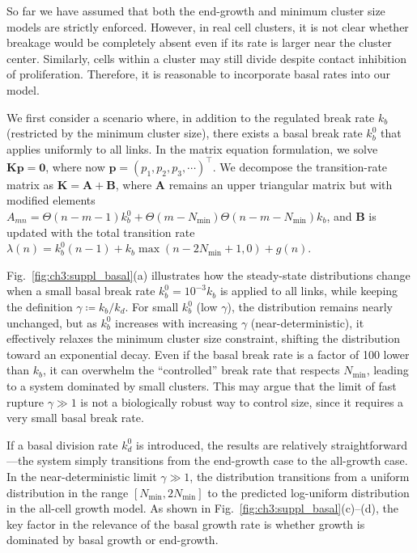 So far we have assumed that both the end-growth and minimum cluster size models are strictly enforced. However, in real cell clusters, it is not clear whether breakage would be completely absent even if its rate is larger near the cluster center. Similarly, cells within a cluster may still divide despite contact inhibition of proliferation. Therefore, it is reasonable to incorporate basal rates into our model.

We first consider a scenario where, in addition to the regulated break rate $k_b$ (restricted by the minimum cluster size), there exists a basal break rate $k_b^0$ that applies uniformly to all links. In the matrix equation formulation, we solve $\bm{K}\mathbf{p}=\mathbf{0}$, where now $\mathbf{p}=(p_1,p_2,p_3,\cdots)^\top$. We decompose the transition-rate matrix as $\bm{K}=\bm{A}+\bm{B}$, where $\bm{A}$ remains an upper triangular matrix but with modified elements $A_{mn} = \Theta(n-m-1) k_b^0 + \Theta(m-N_\textrm{min})\Theta(n-m-N_\textrm{min})k_b$, and $\bm{B}$ is updated with the total transition rate $\lambda(n)=k_b^0(n-1)+k_b\max(n-2N_\textrm{min}+1,0)+g(n)$.

Fig.~\ref{fig:ch3:suppl_basal}(a) illustrates how the steady-state distributions change when a small basal break rate $k_b^0=10^{-3}k_b$ is applied to all links, while keeping the definition $\gamma\coloneq k_b/k_d$. For small $k_b^0$ (low $\gamma$), the distribution remains nearly unchanged, but as $k_b^0$ increases with increasing $\gamma$ (near-deterministic), it effectively relaxes the minimum cluster size constraint, shifting the distribution toward an exponential decay. Even if the basal break rate is a factor of 100 lower than $k_b$, it can overwhelm the ``controlled'' break rate that respects $N_\textrm{min}$, leading to a system dominated by small clusters. This may argue that the limit of fast rupture $\gamma \gg 1$ is not a biologically robust way to control size, since it requires a very small basal break rate.

If a basal division rate $k_d^0$ is introduced, the results are relatively straightforward---the system simply transitions from the end-growth case to the all-growth case. In the near-deterministic limit $\gamma\gg 1$, the distribution transitions from a uniform distribution in the range $[N_\textrm{min}, 2 N_\textrm{min}]$ to the predicted log-uniform distribution in the all-cell growth model. As shown in Fig.~\ref{fig:ch3:suppl_basal}(c)--(d), the key factor in the relevance of the basal growth rate is whether growth is dominated by basal growth or end-growth.

